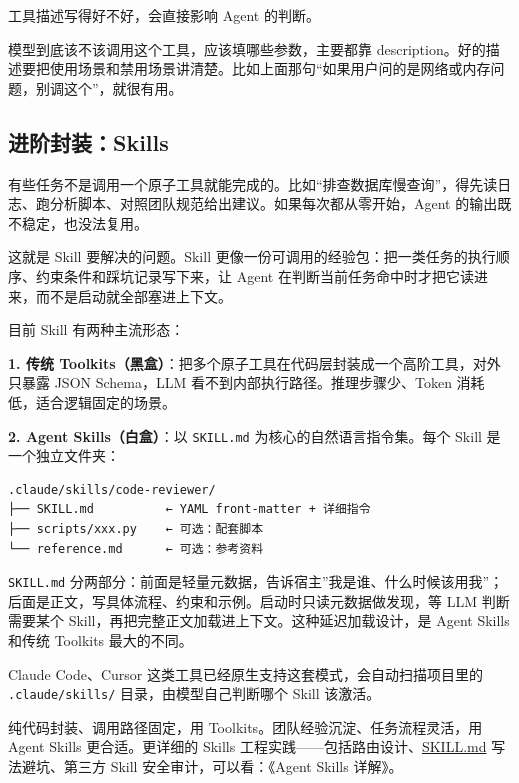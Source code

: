 \documentclass[9pt,a4paper,twocolumn]{ctexart}
\begin{document}
工具描述写得好不好，会直接影响 Agent 的判断。



模型到底该不该调用这个工具，应该填哪些参数，主要都靠 description。好的描述要把使用场景和禁用场景讲清楚。比如上面那句“如果用户问的是网络或内存问题，别调这个”，就很有用。



\subsection*{进阶封装：Skills}


有些任务不是调用一个原子工具就能完成的。比如“排查数据库慢查询”，得先读日志、跑分析脚本、对照团队规范给出建议。如果每次都从零开始，Agent 的输出既不稳定，也没法复用。



这就是 Skill 要解决的问题。Skill 更像一份可调用的经验包：把一类任务的执行顺序、约束条件和踩坑记录写下来，让 Agent 在判断当前任务命中时才把它读进来，而不是启动就全部塞进上下文。



目前 Skill 有两种主流形态：



\textbf{1. 传统 Toolkits（黑盒）}：把多个原子工具在代码层封装成一个高阶工具，对外只暴露 JSON Schema，LLM 看不到内部执行路径。推理步骤少、Token 消耗低，适合逻辑固定的场景。



\textbf{2. Agent Skills（白盒）}：以 \texttt{SKILL.md} 为核心的自然语言指令集。每个 Skill 是一个独立文件夹：



\begin{lstlisting}
.claude/skills/code-reviewer/
├── SKILL.md          ← YAML front-matter + 详细指令
├── scripts/xxx.py    ← 可选：配套脚本
└── reference.md      ← 可选：参考资料
\end{lstlisting}



\texttt{SKILL.md} 分两部分：前面是轻量元数据，告诉宿主”我是谁、什么时候该用我”；后面是正文，写具体流程、约束和示例。启动时只读元数据做发现，等 LLM 判断需要某个 Skill，再把完整正文加载进上下文。这种延迟加载设计，是 Agent Skills 和传统 Toolkits 最大的不同。



Claude Code、Cursor 这类工具已经原生支持这套模式，会自动扫描项目里的 \texttt{.claude/skills/} 目录，由模型自己判断哪个 Skill 该激活。



纯代码封装、调用路径固定，用 Toolkits。团队经验沉淀、任务流程灵活，用 Agent Skills 更合适。更详细的 Skills 工程实践——包括路由设计、\href{http://skill.md/}{SKILL.md} 写法避坑、第三方 Skill 安全审计，可以看：《Agent Skills 详解》。
\end{document}
